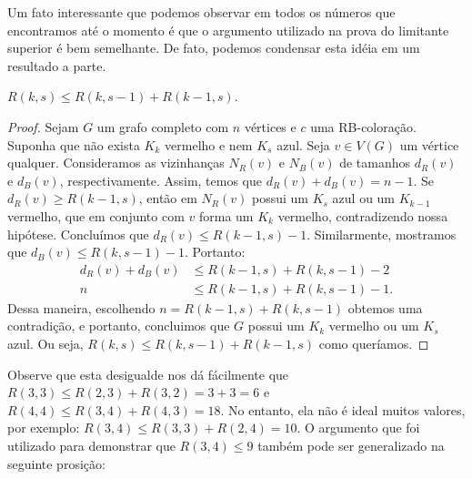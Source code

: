 Um fato interessante que podemos observar em todos os números que encontramos até o momento é que o argumento utilizado na prova do limitante superior é bem semelhante. De fato, podemos condensar esta idéia em um resultado a parte.

\begin{theorem}
\label{prelim:thm:inequality}
$R(k,s) \leq R(k,s-1) + R(k-1,s)$.
\end{theorem}
\begin{proof}
Sejam $G$ um grafo completo com $n$ vértices e $c$ uma RB-coloração. Suponha que não exista $K_k$ vermelho e nem $K_s$ azul. Seja $v \in V(G)$ um vértice qualquer. Consideramos as vizinhanças $N_R(v)$ e $N_B(v)$ de tamanhos $d_R(v)$ e $d_B(v)$, respectivamente. Assim, temos que $d_R(v) + d_B(v) = n-1$. Se $d_R(v) \geq R(k-1,s)$, então em $N_R(v)$ possui um $K_s$ azul ou um $K_{k-1}$ vermelho, que em conjunto com $v$ forma um $K_k$ vermelho, contradizendo nossa hipótese. Concluímos que $d_R(v) \leq R(k-1,s) - 1$. Similarmente, mostramos que $d_B(v) \leq R(k,s-1) - 1$. Portanto:
\begin{align*}
d_R(v) + d_B(v) &\leq R(k-1,s) + R(k,s-1) - 2 \\
n &\leq R(k-1,s) + R(k,s-1) - 1.
\end{align*}
Dessa maneira, escolhendo $n = R(k-1,s) + R(k,s-1)$ obtemos uma contradição, e portanto, concluimos que $G$ possui um $K_k$ vermelho ou um $K_s$ azul. Ou seja, $R(k,s) \leq R(k,s-1) + R(k-1,s)$ como queríamos.
\end{proof}

Observe que esta desigualde nos dá fácilmente que $R(3,3) \leq R(2,3) + R(3,2) = 3 + 3 = 6$ e $R(4,4) \leq R(3,4) + R(4,3) = 18$. No entanto, ela não é ideal muitos valores, por exemplo: $R(3,4) \leq R(3,3) + R(2,4) = 10$. O argumento que foi utilizado para demonstrar que $R(3,4) \leq 9$ também pode ser generalizado na seguinte prosição:

